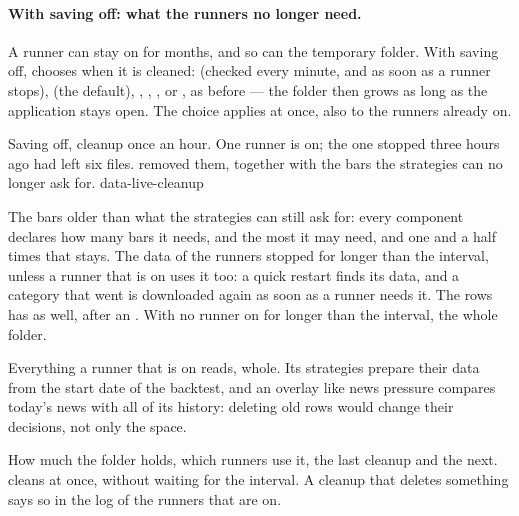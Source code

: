 \paragraph{With saving off: what the runners no longer need.}
A runner can stay on for months, and so can the temporary folder. With saving
off,  chooses when it is cleaned:
 (checked every minute, and as soon as
a runner stops),  (the default), ,
, , or , as
before --- the folder then grows as long as the application stays open. The
choice applies at once, also to the runners already on.

  {Saving off, cleanup once an hour. One runner is on; the one stopped three
   hours ago had left six files.  removed them, together
   with the bars the strategies can no longer ask for.}
  {data-live-cleanup}

\begin{description}[leftmargin = 1.4em, style = nextline, itemsep = 4pt]
  \item[What goes] The bars older than what the strategies can still ask
    for: every component declares how many bars it needs, and the most it
    may need, and one and a half times that stays. The data of the runners
    stopped for longer than the interval, unless a runner that is on uses it
    too: a quick restart finds its data, and a category that went is
    downloaded again as soon as a runner needs it. The rows  has
    as well, after an . With no runner on for longer
    than the interval, the whole folder.
  \item[What stays] Everything a runner that is on reads, whole. Its
    strategies prepare their data from the start date of the backtest, and an
    overlay like news pressure compares today's news with all of its history:
    deleting old rows would change their decisions, not only the space.
  \item[The line below] How much the folder holds, which runners use it, the
    last cleanup and the next.  cleans at once, without
    waiting for the interval. A cleanup that deletes something says so in the
    log of the runners that are on.
\end{description}

